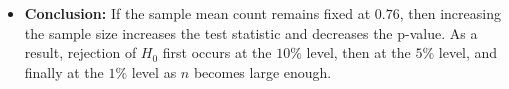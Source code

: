 \begin{itemize}
	
	At \(\alpha=1\%\), fail to reject \(H_0\) since \(0.0232>0.01\).
	
	\begin{center}
	\end{center}
	
	
	\item \textbf{Conclusion:} If the sample mean count remains fixed at \(0.76\), then increasing the sample size increases the test statistic and decreases the p-value. As a result, rejection of \(H_0\) first occurs at the \(10\%\) level, then at the \(5\%\) level, and finally at the \(1\%\) level as \(n\) becomes large enough.
\end{itemize}

